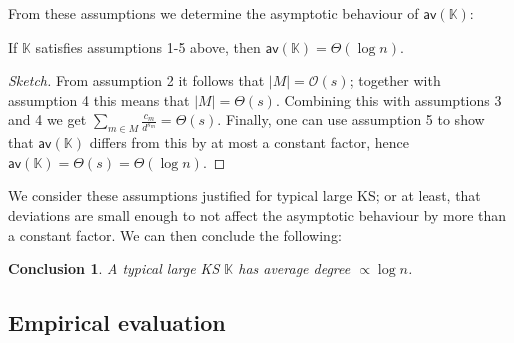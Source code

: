 \documentclass[runngingheads]{llncs}
\newtheorem{conclusion}{Conclusion}
\begin{document}
From these assumptions we determine the asymptotic behaviour of $\mathsf{av}(\mathbb{K})$:

\begin{lemma} \label{lem:logdeg}
If $\mathbb{K}$ satisfies assumptions 1-5 above, then $\mathsf{av}(\mathbb{K}) = \Theta(\log n)$.
\end{lemma}

\begin{proof}[Sketch]
From assumption 2 it follows that $|M| = \mathcal{O}(s)$; together with assumption 4 this means that $|M| = \Theta(s)$. Combining this with assumptions 3 and 4 we get $\sum_{m \in M} \tfrac{c_m}{d^{s_m}} = \Theta(s)$. Finally, one can use assumption 5 to show that $\mathsf{av}(\mathbb{K})$ differs from this by at most a constant factor, hence $\mathsf{av}(\mathbb{K}) = \Theta(s) = \Theta (\log n)$.
\end{proof}

We consider these assumptions justified for typical large KS; or at least, that deviations are small enough to not affect the asymptotic behaviour by more than a constant factor.  We can then conclude the following:

\begin{conclusion}
A typical large KS $\mathbb{K}$ has average degree $\propto \log n$. 
\end{conclusion}

\subsection{Empirical evaluation} \label{ssec:mcc}
\end{document}
